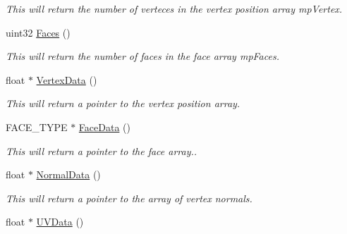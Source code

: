 \begin{DoxyCompactItemize}
\begin{DoxyCompactList}\small\item\em This will return the number of verteces in the vertex position array mpVertex. \end{DoxyCompactList}\item 
\hypertarget{classc_mesh_a5f1b578685730d581301f3b5dbb2f83c}{
uint32 \hyperlink{classc_mesh_a5f1b578685730d581301f3b5dbb2f83c}{Faces} ()}
\label{classc_mesh_a5f1b578685730d581301f3b5dbb2f83c}

\begin{DoxyCompactList}\small\item\em This will return the number of faces in the face array mpFaces. \end{DoxyCompactList}\item 
\hypertarget{classc_mesh_a56283d0c69f6b4987176c8714eb10987}{
float $\ast$ \hyperlink{classc_mesh_a56283d0c69f6b4987176c8714eb10987}{VertexData} ()}
\label{classc_mesh_a56283d0c69f6b4987176c8714eb10987}

\begin{DoxyCompactList}\small\item\em This will return a pointer to the vertex position array. \end{DoxyCompactList}\item 
\hypertarget{classc_mesh_a6bc80e837d5556b84399065c9a21fa79}{
FACE\_\-TYPE $\ast$ \hyperlink{classc_mesh_a6bc80e837d5556b84399065c9a21fa79}{FaceData} ()}
\label{classc_mesh_a6bc80e837d5556b84399065c9a21fa79}

\begin{DoxyCompactList}\small\item\em This will return a pointer to the face array.. \end{DoxyCompactList}\item 
\hypertarget{classc_mesh_a534e2fc01c1ed2319d067cdb2df0c439}{
float $\ast$ \hyperlink{classc_mesh_a534e2fc01c1ed2319d067cdb2df0c439}{NormalData} ()}
\label{classc_mesh_a534e2fc01c1ed2319d067cdb2df0c439}

\begin{DoxyCompactList}\small\item\em This will return a pointer to the array of vertex normals. \end{DoxyCompactList}\item 
\hypertarget{classc_mesh_a98e9d13a984398ecbe18300d435d01d8}{
float $\ast$ \hyperlink{classc_mesh_a98e9d13a984398ecbe18300d435d01d8}{UVData} ()}
\label{classc_mesh_a98e9d13a984398ecbe18300d435d01d8}


\end{DoxyCompactItemize}
